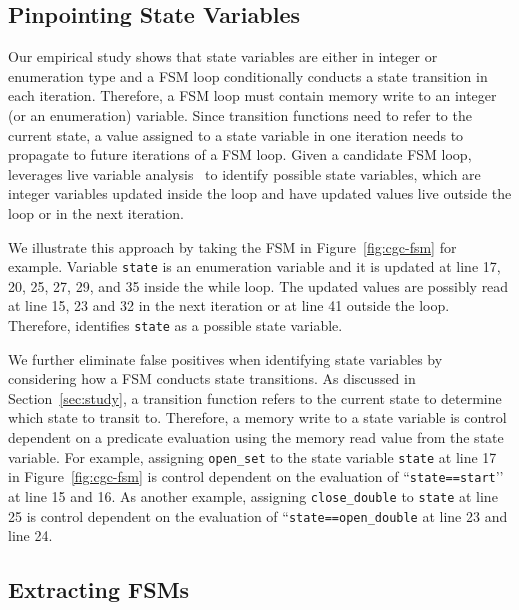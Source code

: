 \subsection{Pinpointing State Variables}

Our empirical study shows that state variables are either in integer or enumeration type
and a FSM loop conditionally conducts a state transition in each iteration. 
Therefore, a FSM loop must contain memory write to an integer 
(or an enumeration) variable. 
Since transition functions need to refer to the current state, 
a value assigned to a state variable in one iteration needs 
to propagate to future iterations of a FSM loop. 
Given a candidate FSM loop, \Tool{} leverages live variable 
analysis~\cite{live-analysis} to 
identify possible state variables, which are integer variables 
updated inside the loop and have updated values live outside the loop 
or in the next iteration. 

We illustrate this approach by taking the FSM 
in Figure~\ref{fig:cgc-fsm} for example. 
Variable \texttt{state} is an enumeration variable and it is updated at 
line 17, 20, 25, 27, 29, and 35 inside the while loop. 
The updated values are possibly read at line 15, 23 and 32 
in the next iteration or at line 41 outside the loop.
Therefore, \Tool{} identifies \texttt{state} as a possible 
state variable.  


We further eliminate false positives when identifying state variables 
by considering how a FSM conducts state transitions. 
As discussed in Section~\ref{sec:study}, 
a transition function refers to the current state to determine which 
state to transit to. Therefore, a memory write to a state 
variable is control dependent 
on a predicate evaluation using the memory read value 
from the state variable.
For example, assigning \texttt{open\_set} to the state variable 
\texttt{state} at line 17 in Figure~\ref{fig:cgc-fsm}
is control dependent on the evaluation of ``\texttt{state==start}’’ at line 15 and 16. 
As another example, 
assigning \texttt{close\_double} to \texttt{state} at 
line 25 is control dependent on the 
evaluation of ``\texttt{state==open\_double} at line 23 and line 24. 



\subsection{Extracting FSMs}

